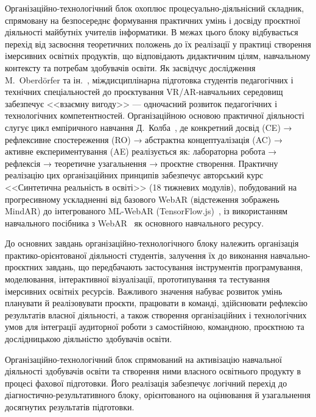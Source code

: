 Організаційно-технологічний блок охоплює процесуально-діяльнісний складник, спрямовану на безпосереднє формування практичних умінь і досвіду проєктної діяльності майбутніх учителів інформатики. В межах цього блоку відбувається перехід від засвоєння теоретичних положень до їх реалізації у практиці створення імерсивних освітніх продуктів, що відповідають дидактичним цілям, навчальному контексту та потребам здобувачів освіти. Як засвідчує дослідження M.~Oberdörfer та ін.~\cite{Oberdorfer2021Interdisciplinary}, міждисциплінарна підготовка студентів педагогічних і технічних спеціальностей до проєктування VR/AR-навчальних середовищ забезпечує <<взаємну вигоду>> --- одночасний розвиток педагогічних і технологічних компетентностей. Організаційною основою практичної діяльності слугує цикл емпіричного навчання Д.~Колба~\cite{Kee2023Experiential}, де конкретний досвід (CE) → рефлексивне спостереження (RO) → абстрактна концептуалізація (AC) → активне експериментування (AE) реалізується як: лабораторна робота → рефлексія → теоретичне узагальнення → проєктне створення. Практичну реалізацію цих організаційних принципів забезпечує авторський курс <<Синтетична реальність в освіті>> (18 тижневих модулів), побудований на прогресивному ускладненні від базового WebAR (відстеження зображень MindAR) до інтегрованого ML-WebAR (TensorFlow.js)~\cite{Semerikov2024WebARML_CoSinE}, із використанням навчального посібника з WebAR~\cite{Shepiliev2020WebAR} як основного навчального ресурсу.

До основних завдань організаційно-технологічного блоку належить організація практико-орієнтованої діяльності студентів, залучення їх до виконання навчально-проєктних завдань, що передбачають застосування інструментів програмування, моделювання, інтерактивної візуалізації, прототипування та тестування імерсивних освітніх ресурсів. Важливого значення набуває розвиток умінь планувати й реалізовувати проєкти, працювати в команді, здійснювати рефлексію результатів власної діяльності, а також створення організаційних і технологічних умов для інтеграції аудиторної роботи з самостійною, командною, проєктною та дослідницькою діяльністю здобувачів освіти.

Організаційно-технологічний блок спрямований на активізацію навчальної діяльності здобувачів освіти та створення ними власного освітнього продукту в процесі фахової підготовки. Його реалізація забезпечує логічний перехід до діагностично-результативного блоку, орієнтованого на оцінювання й узагальнення досягнутих результатів підготовки.


